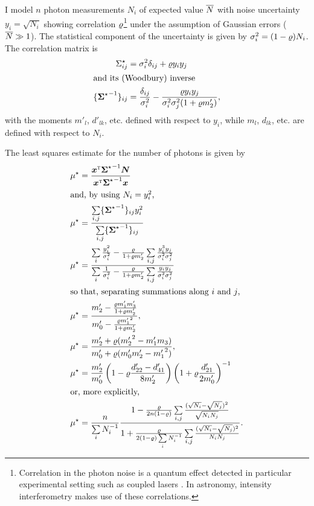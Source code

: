 \documentclass{pasa}
\begin{document}
I model $n$ photon measurements $N_i$ of expected value $\overline{N}$ with noise uncertainty $y_i = \sqrt{N_i}$ showing correlation $\varrho$\footnote{Correlation in the photon noise is a quantum effect detected in particular experimental setting such as coupled lasers \citep[e.g.][]{MAY03}.  In astronomy, intensity interferometry makes use of these correlations.}  under the assumption of Gaussian errors ($\overline{N} \gg 1$). The statistical component of the uncertainty is given by $\sigma_i^2 = (1-\varrho)N_i$. The correlation matrix is
\begin{align*}
    \Sigma^\star_{ij} &= \sigma_i^2\delta_{ij} + \varrho y_i y_j\\
\intertext{and its (Woodbury) inverse}
    \{ {\boldsymbol{\Sigma}^\star}^{-1} \}_{ij}    &= \frac{\delta_{ij}}{\sigma_i^2} 
            - \frac{\varrho y_iy_j}{\sigma_i^2\sigma_j^2(1 + \varrho m'_2)},
\end{align*}
with the moments $m'_l$, $d'_{lk}$, etc. defined with respect to $y_i$, while
$m_l$, $d_{lk}$, etc. are defined with respect to $N_i$.

The least squares estimate for the number of photons is given by
\begin{align*}
    \mu^\star &= \frac { {\boldsymbol{x}}^\text{\textsc{t}}{\ensuremath{\boldsymbol{\Sigma}}^\star}^{-1} \boldsymbol{N} }
                        { {\boldsymbol{x}}^\text{\textsc{t}}{\ensuremath{\boldsymbol{\Sigma}}^\star}^{-1} \boldsymbol{x} }\\
\intertext{and, by using $N_i = y_i^2$,}
    \mu^\star &= \frac{\sum\limits_{i,j} \{ {\boldsymbol{\Sigma}^\star}^{-1} \}_{ij} y_i^2} 
                       {\sum\limits_{i,j} \{ {\boldsymbol{\Sigma}^\star}^{-1} \}_{ij} }\\
    \mu^\star &= \frac{\sum\limits_i \frac{y_i^2}{\sigma_i^2}
                     -  \frac{\varrho}{1+ \varrho m'_2} 
                \sum\limits_{i,j} \frac{y_i^3y_j}{\sigma_i^2\sigma_j^2}}
                  {\sum\limits_i \frac 1{\sigma_i^2}
                     -  \frac{\varrho}{1+ \varrho m'_2} 
                \sum\limits_{i,j} \frac{y_iy_j}{\sigma_i^2\sigma_j^2}}\\
\intertext{so that, separating summations along $i$ and $j$,}
    \mu^\star &= \frac{m'_2 - \frac{\varrho m'_1m'_3}{1 + \varrho m'_2}}
                       {m'_0 - \frac{\varrho {m'_1}^2}{1 + \varrho m'_2}},\\
    \mu^\star &= \frac{m'_2 + \varrho({m'_2}^2 - m'_1m_3)}
                       {m'_0 + \varrho(m'_0m'_2 - {m'_1}^2)},\\
    \mu^\star &= \frac{m'_2}{m'_0} 
                    \left(1 - \varrho\frac{d'_{22} - d'_{41}}{8m'_2}\right)
                    \left(1 + \varrho\frac{d'_{21}}         {2m'_0}\right)^{-1}\\
\intertext{or, more explicitly,}
    \mu^\star &= \frac n{\sum\limits_i N_i^{-1}}
                  \frac{ 
                     1 - \frac{\varrho}{2n(1-\varrho)} 
                     \sum\limits_{i,j} 
                        \frac{(\sqrt{N_i}-\sqrt{N_j})^2}{\sqrt{N_i N_j}} 
                  }{ 1  + \frac{\varrho}{2(1-\varrho)\sum\limits_i N_i^{-1}} 
                     \sum\limits_{i,j} 
                        \frac{(\sqrt{N_i} - \sqrt{N_j})^2}{N_iN_j}}
                                  . 
\end{align*}
\end{document}
